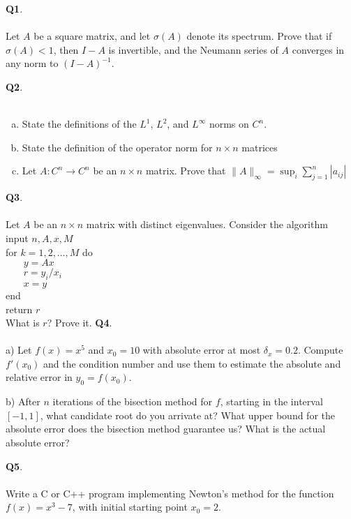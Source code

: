 \documentclass[12pt, oneside]{amsart}
\begin{document}
\vfill


\newpage
\noindent
\textbf{Q1}. \\ \\ 
Let $A$ be a square matrix, and let $\sigma(A)$ denote its spectrum. Prove that
if $\sigma(A) < 1$, then $I-A$ is invertible, and the Neumann series of $A$ converges in any norm to $(I
- A)^{-1}$. \\
\newpage

\noindent
\textbf{Q2}.\\ \\ 
\begin{enumerate}[a)]
\item State the definitions of the $L^1$, $L^2$, and $L^\infty$ norms on $C^n$.
\vspace{2in}
\item State the definition of the operator norm for $n \times n$ matrices
\vspace{2in}
\item Let $A : C^n \to C^n$ be an $n \times n$ matrix. Prove that
$ \| A \|_{\infty} = \sup_i \sum_{j = 1}^n | a_{ij} | $
\end{enumerate}

\newpage

\noindent
\textbf{Q3}. \\ \\ 
Let $A$ be an $n \times n$ matrix with distinct eigenvalues. Consider the
algorithm 
\vspace{0.1in}\\
\noindent
input $n,A,x,M$ \\
for $k=1,2,\ldots,M$ do \\
$\phantom{bobo}y = Ax$ \\
$\phantom{bobo}r = y_i/x_i$ \\
$\phantom{bobo} x = y$ \\
end \\
return $r$ \\
\noindent
\vspace{1.5in}
What is $r$? Prove it.
\newpage
\noindent
\textbf{Q4}. \\ \\ 
\noindent
a) Let $f(x)=x^5$ and $x_0=10$ with absolute error at most $\delta_x=0.2$. Compute $f'(x_0)$ and the condition number and use them to estimate 
the absolute and relative error in $y_0=f(x_0)$. 

\vspace{4in}

\noindent
b) After $n$ iterations of the bisection method for $f$, starting in the interval $[-1, 1]$, what candidate root do you arrivate at? What upper bound for the absolute error does the bisection method guarantee us? What is the actual absolute error?  

\newpage
\noindent

\noindent \textbf{Q5}. \\ \\ 
\noindent
Write a C or C++ program implementing Newton's method for the function $f(x) = x^3 -7$, with initial starting point $x_0 = 2$.    
\vspace{2in}
\end{document}

